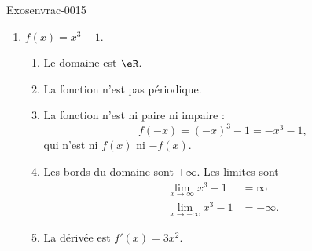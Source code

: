 \begin{corrige}{Exosenvrac-0015}


    \begin{enumerate}
        \item
            \( f(x)=x^3-1\).
            \begin{enumerate}
                \item
                    Le domaine est \( \eR\).
                  \item La fonction n'est pas p\'eriodique. 
                \item
                    La fonction n'est ni paire ni impaire :
                    \begin{equation}
                        f(-x)=(-x)^3-1=-x^3-1,
                    \end{equation}
                    qui n'est ni \( f(x)\) ni \( -f(x)\).
                \item
                    Les bords du domaine sont \( \pm\infty\). Les limites sont
                    \begin{subequations}
                        \begin{align}
                            \lim_{x\to \infty} x^3-1&=\infty\\
                            \lim_{x\to -\infty} x^3-1&=-\infty.
                        \end{align}
                    \end{subequations}
                \item
                    La dérivée est \( f'(x)=3x^2\).


\end{enumerate}
\end{enumerate}
\end{corrige}
